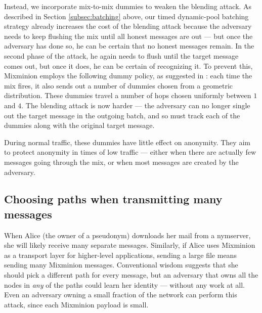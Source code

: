 \documentclass[11pt]{IEEEtran}
\begin{document}
Instead, we incorporate mix-to-mix dummies to weaken the blending attack.  As
described in
Section \ref{subsec:batching} above, our timed
dynamic-pool batching strategy already increases the cost of the blending attack
because the adversary needs to keep flushing the mix until all honest
messages are out --- but once the adversary has done so, he can be certain that no
honest messages remain. In the second phase of the attack, he again
needs to flush until the target message comes out, but once it does, he
can be certain of recognizing it. To prevent this, Mixminion employs the following
dummy policy, as suggested in \cite{batching-taxonomy}:
each time the mix
fires, it also sends out a number of dummies chosen from a geometric
distribution. These dummies travel a number of hops chosen uniformly
between $1$ and $4$. The blending attack is now harder --- the adversary
can no longer single out the target message in the outgoing batch, and so
must track each of the dummies along with the original target message.

During normal traffic, these dummies have little effect on anonymity. They
aim to protect anonymity in times of low traffic --- either when there are
actually few messages going through the mix, or when most messages are
created by the adversary.

\subsection{Choosing paths when transmitting many messages}
\label{subsec:many-messages}

When Alice (the owner of a pseudonym) downloads her mail from a
nymserver, she will likely receive many separate messages. Similarly, if
Alice uses Mixminion as a transport layer for higher-level applications,
sending a large file means sending many Mixminion messages.
Conventional wisdom suggests that she should pick a different
path for every message, but an adversary that owns all the nodes in
\emph{any} of the paths could learn her identity --- without any work
at all. Even an adversary owning a small fraction of the network
can perform this attack, since each Mixminion payload is small.

\end{document}
